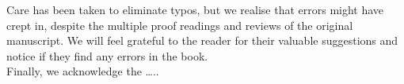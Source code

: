 \hspace{1 cm} Care has been taken to eliminate typos, but we realise that errors might have crept in, despite the multiple proof readings and reviews of the original manuscript. We will feel grateful to the reader for their valuable suggestions and notice if they find any errors in the book.\\

\hspace{1cm} Finally, we acknowledge the …..         
